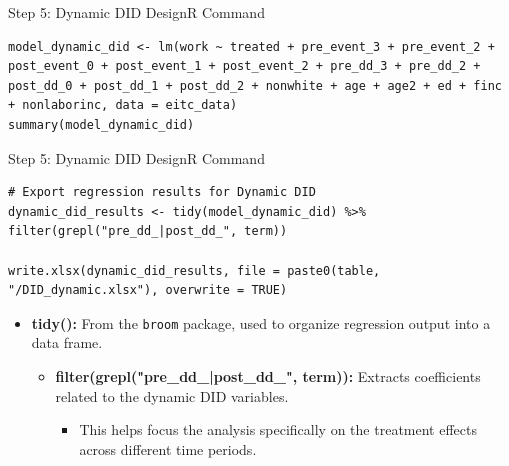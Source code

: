 \documentclass[dvipsnames,hyperref={pdfpagelabels=false}]{beamer}
\begin{document}
\begin{frame}[fragile]{Step 5: Dynamic DID Design}{R Command}
	
\begin{lstlisting}	
model_dynamic_did <- lm(work ~ treated + pre_event_3 + pre_event_2 + post_event_0 + post_event_1 + post_event_2 + pre_dd_3 + pre_dd_2 + post_dd_0 + post_dd_1 + post_dd_2 + nonwhite + age + age2 + ed + finc + nonlaborinc, data = eitc_data)
summary(model_dynamic_did)
\end{lstlisting}

\end{frame}


\begin{frame}[fragile]{Step 5: Dynamic DID Design}{R Command}

\begin{lstlisting}	
# Export regression results for Dynamic DID
dynamic_did_results <- tidy(model_dynamic_did) %>%
filter(grepl("pre_dd_|post_dd_", term))

write.xlsx(dynamic_did_results, file = paste0(table, "/DID_dynamic.xlsx"), overwrite = TRUE)
\end{lstlisting}
	\begin{itemize}
		\item \textbf{tidy():} From the \texttt{broom} package, used to organize regression output into a data frame.
					\vspace{0.2cm}
		\begin{itemize}
			\item \textbf{filter(grepl("pre\_dd\_|post\_dd\_", term)):} Extracts coefficients related to the dynamic DID variables. 
						\vspace{0.2cm}
				\begin{itemize}
			\item This helps focus the analysis specifically on the treatment effects across different time periods.
					\end{itemize}
		\end{itemize}
	\end{itemize}
\end{frame}
\end{document}
